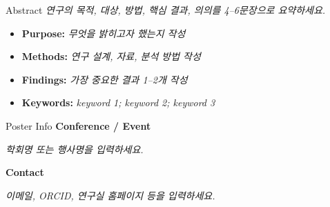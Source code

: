 \documentclass[a0paper,portrait]{KNUE_baposter}
\newcommand{\TemplateText}[1]{{\color{aaublue2}\itshape #1}}
\begin{document}
\begin{poster}
%
\begin{posterbox}[name=abstract,column=0,row=0,span=2]{Abstract}
\footnotesize
\TemplateText{연구의 목적, 대상, 방법, 핵심 결과, 의의를 4--6문장으로 요약하세요.}

\vspace{0.7em}
\scriptsize
\begin{itemize}
\item \textbf{Purpose:} \TemplateText{무엇을 밝히고자 했는지 작성}
\item \textbf{Methods:} \TemplateText{연구 설계, 자료, 분석 방법 작성}
\item \textbf{Findings:} \TemplateText{가장 중요한 결과 1--2개 작성}
\item \textbf{Keywords:} \TemplateText{keyword 1; keyword 2; keyword 3}
\end{itemize}
\end{posterbox}

%
\begin{posterbox}[name=posterinfo,column=1,below=abstract]{Poster Info}
\footnotesize
\textbf{Conference / Event}

\scriptsize
\TemplateText{학회명 또는 행사명을 입력하세요.}

\vspace{0.6em}
\footnotesize
\textbf{Contact}

\scriptsize
\TemplateText{이메일, ORCID, 연구실 홈페이지 등을 입력하세요.}


\end{posterbox}
\end{poster}
\end{document}
